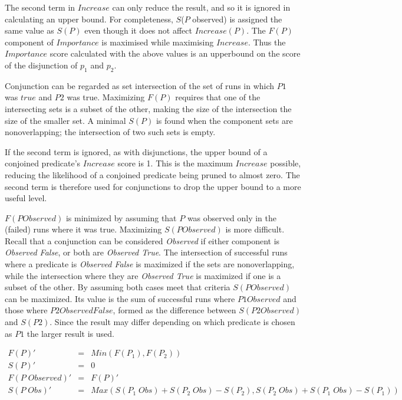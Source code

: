 The second term in $Increase$ can only reduce the result, and so it is ignored in calculating an upper bound.  For completeness, $S$($P$ observed) is assigned the same value as $S(P)$ even though it does not affect $Increase(P)$.  The $F(P)$ component of $Importance$ is maximised while maximising $Increase$.  Thus the $Importance$ score calculated with the above values is an upperbound on the score of the disjunction of $p_1$ and $p_2$.

Conjunction can be regarded as set intersection of the set of runs in which $P1$ was $true$ and $P2$ was true.  Maximizing $F(P)$ requires that one of the intersecting sets is a subset of the other, making the size of the intersection the size of the smaller set.  A minimal $S(P)$ is found when the component sets are nonoverlapping; the intersection of two such sets is empty.

If the second term is ignored, as with disjunctions, the upper bound of a conjoined predicate's $Increase$ score is 1.  This is the maximum $Increase$ possible, reducing the likelihood of a conjoined predicate being pruned to almost zero.  The second term is therefore used for conjunctions to drop the upper bound to a more useful level.

$F(P Observed)$ is minimized by assuming that $P$ was observed only in the (failed) runs where it was true.  Maximizing $S(P Observed)$ is more difficult.  Recall that a conjunction can be considered \textit{Observed} if either component is \textit{Observed False}, or both are \textit{Observed True}.  The intersection of successful runs where a predicate is \textit{Observed False} is maximized if the sets are nonoverlapping, while the intersection where they are \textit{Observed True} is maximized if one is a subset of the other.  By assuming both cases meet that criteria $S(P Observed)$ can be maximized.  Its value is the sum of successful runs where $P1 Observed$ and those where $P2 Observed False$, formed as the difference between $S(P2 Observed)$ and $S(P2)$.  Since the result may differ depending on which predicate is chosen as $P1$ the larger result is used.

\begin{eqnarray}
 \nonumber %
  F(P)' &=&  Min(F(P_1),F(P_2)) \\
 \nonumber
  S(P)' &=& 0 \\
 \nonumber
  F(P\;Observed)' &=& F(P)' \\
 \nonumber
  S(P\;Obs)' &=&
  Max(S(P_1\;Obs)+S(P_2\;Obs)-S(P_2),S(P_2\;Obs)+S(P_1\;Obs)-S(P_1))
\end{eqnarray}

